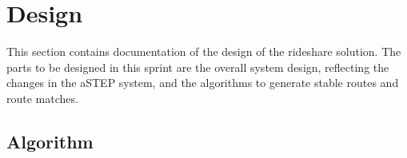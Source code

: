 \section{Design}

This section contains documentation of the design of the rideshare solution.
The parts to be designed in this sprint are the overall system design, reflecting the changes in the aSTEP system, and the algorithms to generate stable routes and route matches.



\subsection{Algorithm}


